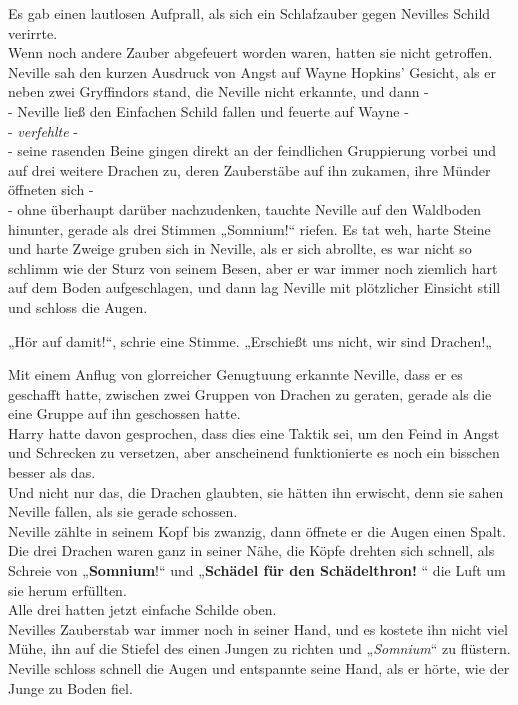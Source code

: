 {Es gab einen lautlosen Aufprall, als sich ein Schlafzauber gegen Nevilles Schild verirrte.\\ Wenn noch andere Zauber abgefeuert worden waren, hatten sie nicht getroffen. Neville sah den kurzen Ausdruck von Angst auf Wayne Hopkins' Gesicht, als er neben zwei Gryffindors stand, die Neville nicht erkannte, und dann -\\ - Neville ließ den Einfachen Schild fallen und feuerte auf Wayne -\\ - \emph{verfehlte} -\\ - seine rasenden Beine gingen direkt an der feindlichen Gruppierung vorbei und auf drei weitere Drachen zu, deren Zauberstäbe auf ihn zukamen, ihre Münder öffneten sich -\\ - ohne überhaupt darüber nachzudenken, tauchte Neville auf den Waldboden hinunter, gerade als drei Stimmen „Somnium!“ riefen. Es tat weh, harte Steine und harte Zweige gruben sich in Neville, als er sich abrollte, es war nicht so schlimm wie der Sturz von seinem Besen, aber er war immer noch ziemlich hart auf dem Boden aufgeschlagen, und dann lag Neville mit plötzlicher Einsicht still und schloss die Augen.

„Hör auf damit!“, schrie eine Stimme. „Erschießt uns nicht, wir sind Drachen!„

Mit einem Anflug von glorreicher Genugtuung erkannte Neville, dass er es geschafft hatte, zwischen zwei Gruppen von Drachen zu geraten, gerade als die eine Gruppe auf ihn geschossen hatte.\\ Harry hatte davon gesprochen, dass dies eine Taktik sei, um den Feind in Angst und Schrecken zu versetzen, aber anscheinend funktionierte es noch ein bisschen besser als das.\\ Und nicht nur das, die Drachen glaubten, sie hätten ihn erwischt, denn sie sahen Neville fallen, als sie gerade schossen.\\ Neville zählte in seinem Kopf bis zwanzig, dann öffnete er die Augen einen Spalt. Die drei Drachen waren ganz in seiner Nähe, die Köpfe drehten sich schnell, als Schreie von „\textbf{Somnium}!“ und „\textbf{Schädel für den Schädelthron!} “ die Luft um sie herum erfüllten.\\ Alle drei hatten jetzt einfache Schilde oben.\\ Nevilles Zauberstab war immer noch in seiner Hand, und es kostete ihn nicht viel Mühe, ihn auf die Stiefel des einen Jungen zu richten und „\emph{Somnium}“ zu flüstern.\\ Neville schloss schnell die Augen und entspannte seine Hand, als er hörte, wie der Junge zu Boden fiel.

}
